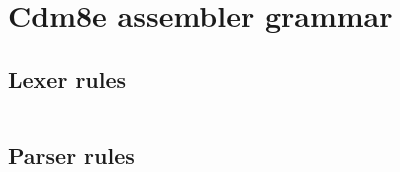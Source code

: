 \documentclass{ol-softwaremanual}
\begin{document}


    \newpage
    \appendix
    \section{Cdm8e assembler grammar}
    \subsection{Lexer rules}
    \inputminted[breaklines]{antlr}{../cdm_asm/AsmLexer.g4}
    \subsection{Parser rules}
    \inputminted[breaklines]{antlr}{../cdm_asm/AsmParser.g4}
\end{document}
